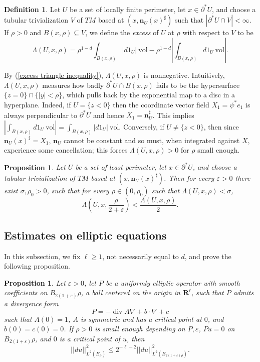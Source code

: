 \documentclass[reqno,12pt,letterpaper]{amsart}
\newcommand{\RR}{\mathbf{R}}
\DeclareMathOperator{\Div}{div}
\newcommand{\normal}{\mathbf n}
\newcommand{\vol}{\mathrm{vol}}
\newcommand{\dfn}[1]{\emph{#1}\index{#1}}
\newtheorem{proposition}[theorem]{Proposition}
\theoremstyle{definition}
\newtheorem{definition}[theorem]{Definition}
\numberwithin{equation}{section}
\begin{document}
\begin{definition}
Let $U$ be a set of locally finite perimeter, let $x \in \partial^* U$, and choose a tubular trivialization $V$ of $TM$ based at $(x, \normal_U(x)^\sharp)$ such that $|\partial^* U \cap V| < \infty$.
If $\rho > 0$ and $B(x, \rho) \subseteq V$, we define the \dfn{excess} of $U$ at $\rho$ with respect to $V$ to be
$$\Lambda(U, x, \rho) = \rho^{1 - d}\int_{B(x, \rho)} |d1_U| ~\vol - \rho^{1 - d}\left|\int_{B(x, \rho)} d1_U ~\vol\right|.$$
\end{definition}

By (\ref{excess triangle inequality}), $\Lambda(U, x, \rho)$ is nonnegative.
Intuitively, $\Lambda(U, x, \rho)$ measures how badly $\partial^*U \cap B(x, \rho)$ fails to be the hypersurface $\{z = 0\} \cap \{|y| < \rho\}$, which pulls back by the exponential map to a disc in a hyperplane.
Indeed, if $U = \{z < 0\}$ then the coordinate vector field $X_1 = \psi^* e_1$ is always perpendicular to $\partial^* U$ and hence $X_1 = \normal_U^\sharp$. This implies $|\int_{B(x, \rho)} d1_U ~\vol| = \int_{B(x, \rho)} |d1_U| ~\vol$.
Conversely, if $U \neq \{z < 0\}$, then since $\normal_U(x)^\sharp = X_1$, $\normal_U$ cannot be constant and so must, when integrated against $X$, experience some cancellation; this forces $\Lambda(U, x, \rho) > 0$ for $\rho$ small enough.

\begin{proposition}\label{bootstrap minimal surfaces}
Let $U$ be a set of least perimeter, let $x \in \partial^* U$, and choose a tubular trivialization of $TM$ based at $(x, \normal_U(x)^\sharp)$.
Then for every $\varepsilon > 0$ there exist $\sigma, \rho_0 > 0$, such that for every $\rho \in (0, \rho_0)$ such that $\Lambda(U, x, \rho) < \sigma$,
$$\Lambda\left(U, x, \frac{\rho}{2 + \varepsilon}\right) < \frac{\Lambda(U, x, \rho)}{2}.$$
\end{proposition}

\subsection{Estimates on elliptic equations}
In this subsection, we fix $\ell \geq 1$, not necessarily equal to $d$, and prove the following proposition.

\begin{proposition}\label{bootstrap elliptic}
Let $\varepsilon > 0$, let $P$ be a uniformly elliptic operator with smooth coefficients on $B_{2(1 + \varepsilon)}\rho$, a ball centered on the origin in $\RR^\ell$, such that $P$ admits a divergence form
$$P = -\Div A \nabla + b \cdot \nabla + c$$
such that $A(0) = 1$, $A$ is symmetric and has a critical point at $0$, and $b(0) = c(0) = 0$.
If $\rho > 0$ is small enough depending on $P, \varepsilon$, $Pu = 0$ on $B_{2(1 + \varepsilon)}\rho$, and $0$ is a critical point of $u$, then
$$||du||_{L^2(B_\rho)}^2 \leq 2^{-\ell-2}||du||_{L^2(B_{2(1 + \varepsilon)\rho})}^2.$$
\end{proposition}
\end{document}
